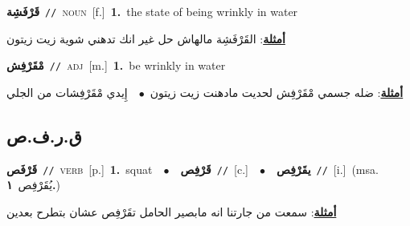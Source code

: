 \documentclass[10pt,a4paper,twoside]{article} %
\begin{document}
\begin{multicols}{2}
{\setlength\topsep{0pt}\textbf{\foreignlanguage{arabic}{قَرْفَشِة}}\ {\color{gray}\texttt{//}\color{black}}\ \textsc{noun}\ [f.]\ \textbf{1.}~the state of being wrinkly in water\  \begin{flushright}\color{gray}\foreignlanguage{arabic}{\textbf{\underline{\foreignlanguage{arabic}{أمثلة}}}: القَرْفَشِة مالهاش حل غير انك تدهني شوية زيت زيتون}\end{flushright}\color{black}} \vspace{2mm}

{\setlength\topsep{0pt}\textbf{\foreignlanguage{arabic}{مْقَرْفِش}}\ {\color{gray}\texttt{//}\color{black}}\ \textsc{adj}\ [m.]\ \textbf{1.}~be wrinkly in water\  \begin{flushright}\color{gray}\foreignlanguage{arabic}{\textbf{\underline{\foreignlanguage{arabic}{أمثلة}}}: ضله جسمي مْقَرْفِش لحديت مادهنت زيت زيتون\ $\bullet$\ \  إِيدي مْقَرْفِشات من الجلي}\end{flushright}\color{black}} \vspace{2mm}

\vspace{-3mm}
\subsection*{\color{blue}\foreignlanguage{arabic}{ق.ر.ف.ص}\color{blue}{}} 

{\setlength\topsep{0pt}\textbf{\foreignlanguage{arabic}{قَرْفَص}}\ {\color{gray}\texttt{//}\color{black}}\ \textsc{verb}\ [p.]\ \textbf{1.}~squat\ \ $\bullet$\ \ \setlength\topsep{0pt}\textbf{\foreignlanguage{arabic}{قَرْفِص}}\ {\color{gray}\texttt{//}\color{black}}\ [c.]\ \ $\bullet$\ \ \setlength\topsep{0pt}\textbf{\foreignlanguage{arabic}{يقَرْفِص}}\ {\color{gray}\texttt{//}\color{black}}\ [i.]\ \color{gray}(msa. \foreignlanguage{arabic}{يُقَرْفِص}~\foreignlanguage{arabic}{\textbf{١.}})\color{black}\  \begin{flushright}\color{gray}\foreignlanguage{arabic}{\textbf{\underline{\foreignlanguage{arabic}{أمثلة}}}: سمعت من جارتنا انه مابصير الحامل تقَرْفِص عشان بتطرح بعدين}\end{flushright}\color{black}} \vspace{2mm}


\end{multicols}
\end{document}
